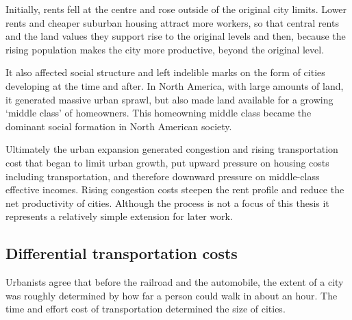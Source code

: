 
Initially, rents fell at the centre and rose outside of the original city limits. Lower rents and cheaper suburban housing attract more workers, so that central rents and the land values they support  rise to the original levels and then, because the rising population makes the
city more productive, beyond the original level. 

It  also affected social structure and left indelible marks on the form of cities developing at the time and after. In North America, with large amounts of land, it generated massive urban sprawl, but also made land available for a growing `middle class' of homeowners. This homeowning middle class became the dominant social formation in North 
American society. 

Ultimately the urban expansion generated congestion and rising transportation cost that began to limit urban growth, put upward pressure on  housing costs including transportation, and therefore downward pressure on middle-class effective incomes. Rising congestion costs steepen the rent profile and  reduce the net productivity of cities. Although the process is not a focus of this thesis it represents a relatively simple extension for later work.

\subsection{Differential transportation costs}
 Urbanists agree that before the railroad and the automobile, the extent of a city was roughly determined by how far a person could walk in about an hour. The time and effort cost of transportation determined the size of cities. 
 
